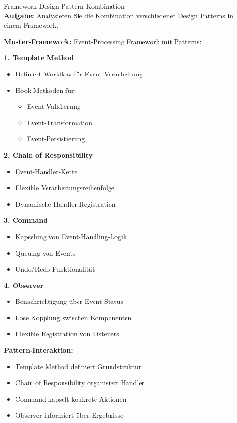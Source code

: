 \begin{example2}{Framework Design Pattern Kombination}\\
\textbf{Aufgabe:} 
Analysieren Sie die Kombination verschiedener Design Patterns in einem Framework.

\textbf{Muster-Framework:}
Event-Processing Framework mit Patterns:

\textbf{1. Template Method}
\begin{itemize}
    \item Definiert Workflow für Event-Verarbeitung
    \item Hook-Methoden für:
    \begin{itemize}
        \item Event-Validierung
        \item Event-Transformation
        \item Event-Persistierung
    \end{itemize}
\end{itemize}

\textbf{2. Chain of Responsibility}
\begin{itemize}
    \item Event-Handler-Kette
    \item Flexible Verarbeitungsreihenfolge
    \item Dynamische Handler-Registration
\end{itemize}

\textbf{3. Command}
\begin{itemize}
    \item Kapselung von Event-Handling-Logik
    \item Queuing von Events
    \item Undo/Redo Funktionalität
\end{itemize}

\textbf{4. Observer}
\begin{itemize}
    \item Benachrichtigung über Event-Status
    \item Lose Kopplung zwischen Komponenten
    \item Flexible Registration von Listeners
\end{itemize}

\textbf{Pattern-Interaktion:}
\begin{itemize}
    \item Template Method definiert Grundstruktur
    \item Chain of Responsibility organisiert Handler
    \item Command kapselt konkrete Aktionen
    \item Observer informiert über Ergebnisse
\end{itemize}
\end{example2}

